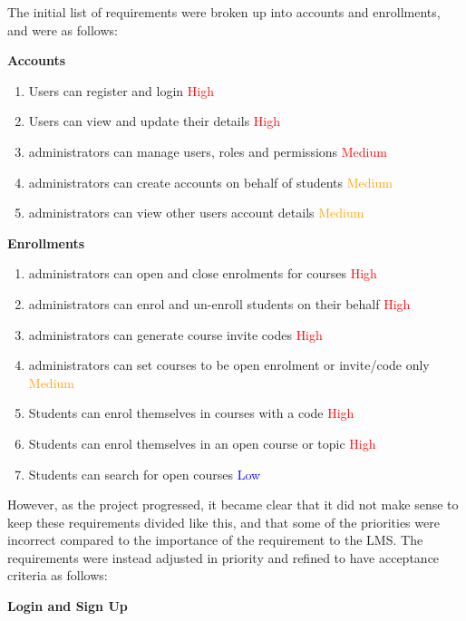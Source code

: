 The initial list of requirements were broken up into accounts and enrollments, and were as follows:

\textbf{Accounts}

    \begin{enumerate}
    \item Users can register and login \textcolor{Red}{High}
    \item Users can view and update their details \textcolor{Red}{High}
    \item administrators can manage users, roles and permissions \textcolor{Red}{Medium}
    \item administrators can create accounts on behalf of students \textcolor{Orange}{Medium}
    \item administrators can view other users account details \textcolor{Orange}{Medium}
    \end{enumerate}

\textbf{Enrollments}

    \begin{enumerate}
    \item administrators can open and close enrolments for courses \textcolor{Red}{High}
    \item administrators can enrol and un-enroll students on their behalf \textcolor{Red}{High}
    \item administrators can generate course invite codes \textcolor{Red}{High}
    \item administrators can set courses to be open enrolment or invite/code only \textcolor{Orange}{Medium}
    \item Students can enrol themselves in courses with a code \textcolor{Red}{High}
    \item Students can enrol themselves in an open course or topic \textcolor{Red}{High}
    \item Students can search for open courses \textcolor{Blue}{Low}
    \end{enumerate}

However, as the project progressed, it became clear that it did not make sense to keep these requirements divided like this, and that some of the priorities were incorrect compared to the importance of the requirement to the LMS. The requirements were instead adjusted in priority and refined to have acceptance criteria as follows:

\textbf{Login and Sign Up}


